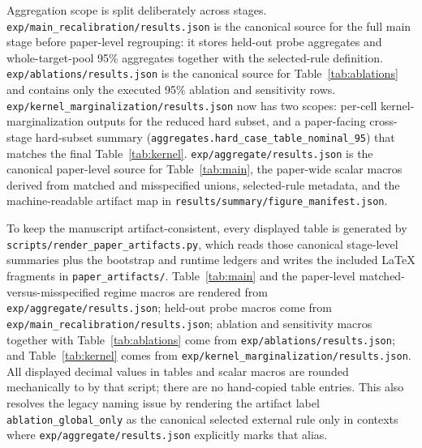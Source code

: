 \documentclass{article}
\begin{document}
Aggregation scope is split deliberately across stages. \texttt{exp/main\_recalibration/results.json} is the canonical source for the full main stage before paper-level regrouping: it stores held-out probe aggregates and whole-target-pool 95\% aggregates together with the selected-rule definition. \texttt{exp/ablations/results.json} is the canonical source for Table~\ref{tab:ablations} and contains only the executed 95\% ablation and sensitivity rows. \texttt{exp/kernel\_marginalization/results.json} now has two scopes: per-cell kernel-marginalization outputs for the reduced hard subset, and a paper-facing cross-stage hard-subset summary (\texttt{aggregates.hard\_case\_table\_nominal\_95}) that matches the final Table~\ref{tab:kernel}. \texttt{exp/aggregate/results.json} is the canonical paper-level source for Table~\ref{tab:main}, the paper-wide scalar macros derived from matched and misspecified unions, selected-rule metadata, and the machine-readable artifact map in \texttt{results/summary/figure\_manifest.json}.

To keep the manuscript artifact-consistent, every displayed table is generated by \texttt{scripts/render\_paper\_artifacts.py}, which reads those canonical stage-level summaries plus the bootstrap and runtime ledgers and writes the included LaTeX fragments in \texttt{paper\_artifacts/}. Table~\ref{tab:main} and the paper-level matched-versus-misspecified regime macros are rendered from \texttt{exp/aggregate/results.json}; held-out probe macros come from \texttt{exp/main\_recalibration/results.json}; ablation and sensitivity macros together with Table~\ref{tab:ablations} come from \texttt{exp/ablations/results.json}; and Table~\ref{tab:kernel} comes from \texttt{exp/kernel\_marginalization/results.json}. All displayed decimal values in tables and scalar macros are rounded mechanically to \PaperRoundingPolicy{} by that script; there are no hand-copied table entries. This also resolves the legacy naming issue by rendering the artifact label \texttt{ablation\_global\_only} as the canonical selected external rule only in contexts where \texttt{exp/aggregate/results.json} explicitly marks that alias.
\end{document}
